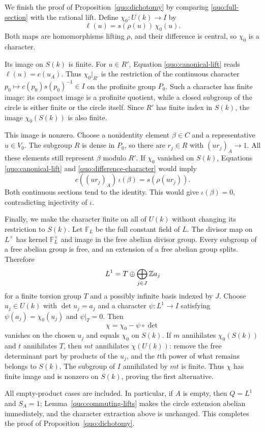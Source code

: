 We finish the proof of Proposition~\ref{quo:dichotomy} by comparing
\eqref{quo:full-section} with the rational lift.  Define
$\chi_0:U(k)\to I$ by
\begin{equation}\label{quo:difference-character}
 \ell(u)=s(\rho(u))\,\chi_0(u).
\end{equation}
Both maps are homomorphisms lifting $\rho$, and their difference is
central, so $\chi_0$ is a character.

Its image on $S(k)$ is finite.  For $u\in R'$, Equation
\eqref{quo:canonical-lift} reads $\ell(u)=c(u_A)$.
Thus $\chi_0|_{R'}$ is the restriction of the continuous character
$p_0\mapsto c(p_0)s(p_0)^{-1}\in I$ on the profinite group $P_0$.  Such a character has finite
image: its compact image is a profinite quotient, while a closed
subgroup of the circle is either finite or the circle itself.
Since $R'$ has finite index in $S(k)$, the image $\chi_0(S(k))$ is
also finite.

This image is nonzero.  Choose a nonidentity element $\beta\in C$
and a representative $u\in V_0$.  The subgroup $R$ is dense in
$P_0$, so there are $r_j\in R$ with $(ur_j)_A\to1$.
All these elements still represent $\beta$ modulo $R'$.
If $\chi_0$ vanished on $S(k)$, Equations
\eqref{quo:canonical-lift} and \eqref{quo:difference-character} would
imply
\[
 c((ur_j)_A)\,\iota(\beta)=s(\rho(ur_j)).
\]
Both continuous sections tend to the identity.  This would give
$\iota(\beta)=0$, contradicting injectivity of $\iota$.

Finally, we make the character finite on all of $U(k)$ without
changing its restriction to $S(k)$.  Let $\mathbb F_L$ be the full
constant field of $L$.  The divisor map on $L^\times$ has kernel
$\mathbb F_L^\times$ and image in the free abelian divisor group.
Every subgroup of a free abelian group is free, and an extension
of a free abelian group splits.  Therefore
\[
 L^1=T\oplus\bigoplus_{j\in J}\mathbb Z a_j
\]
for a finite torsion group $T$ and a possibly infinite basis indexed
by $J$.  Choose $u_j\in U(k)$ with $\det u_j=a_j$ and a character
$\psi:L^1\to I$ satisfying
$\psi(a_j)=\chi_0(u_j)$ and $\psi|_T=0$.  Then
\[
 \chi=\chi_0-\psi\circ\det
\]
vanishes on the chosen $u_j$ and equals $\chi_0$ on $S(k)$.
If $m$ annihilates $\chi_0(S(k))$ and $t$ annihilates $T$, then
$mt$ annihilates $\chi(U(k))$: remove the free determinant part by
products of the $u_j$, and the $t$th power of what remains belongs
to $S(k)$.  The subgroup of $I$ annihilated by $mt$ is finite.
Thus $\chi$ has finite image and is nonzero on $S(k)$, proving the
first alternative.

All empty-product cases are included.  In particular, if $A$ is empty,
then $Q=L^1$ and $S_A=1$; Lemma~\ref{quo:commuting-lifts} makes the
circle extension abelian immediately, and the character extraction
above is unchanged.  This completes the proof of
Proposition~\ref{quo:dichotomy}.
